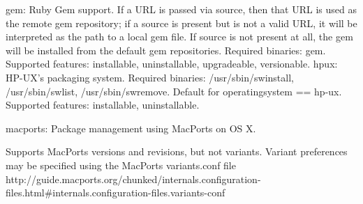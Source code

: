     gem: Ruby Gem support. If a URL is passed via source, then that URL is used as the remote gem repository; if a source is present but is not a valid URL, it will be interpreted as the path to a local gem file. If source is not present at all, the gem will be installed from the default gem repositories. Required binaries: gem. Supported features: installable, uninstallable, upgradeable, versionable.
    hpux: HP-UX’s packaging system. Required binaries: /usr/sbin/swinstall, /usr/sbin/swlist, /usr/sbin/swremove. Default for operatingsystem == hp-ux. Supported features: installable, uninstallable.

    macports: Package management using MacPorts on OS X.

    Supports MacPorts versions and revisions, but not variants. Variant preferences may be specified using the MacPorts variants.conf file http://guide.macports.org/chunked/internals.configuration-files.html#internals.configuration-files.variants-conf

